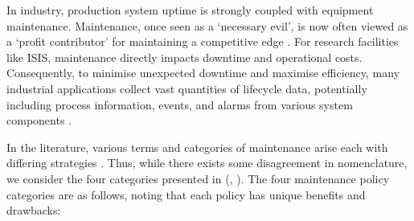 \documentclass[10pt,oneside]{report}
\renewcommand{\citet}[1]{\citeauthor{#1}, \citeyear{#1}}
\begin{document}
In industry, production system uptime is strongly coupled with equipment maintenance. Maintenance, once seen as a `necessary evil', is now often viewed as a `profit contributor' for maintaining a competitive edge \cite{waeyenbergh2002framework, faccio2014industrial}. For research facilities like ISIS, maintenance directly impacts downtime and operational costs. Consequently, to minimise unexpected downtime and maximise efficiency, many industrial applications collect vast quantities of lifecycle data, potentially including process information, events, and alarms from various system components \cite{carvalho2019systematic}.



In the literature, various terms and categories of maintenance arise each with differing strategies \cite{susto2012predictive, mobley2002introduction, susto2016dealing}. Thus, while there exists some disagreement in nomenclature, we consider the four categories presented in (\citet{susto2012predictive}). The four maintenance policy categories are as follows, noting that each policy has unique benefits and drawbacks:
\end{document}
